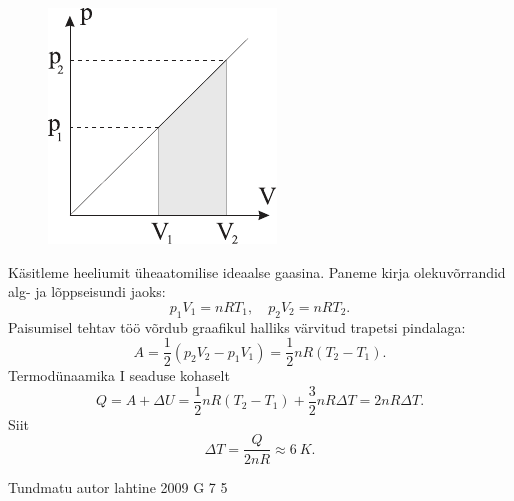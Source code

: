 \documentclass[11pt, twoside]{article}
\begin{document}
{{\ifSolution
\begin{figure}
	\begin{center}
		\vspace{-25pt}
		\includegraphics[width=0.95\linewidth]{2008-lahg-06-lah}
	\end{center}
\end{figure}
Käsitleme heeliumit üheaatomilise ideaalse gaasina. 
Paneme kirja olekuvõrrandid alg- ja lõppseisundi jaoks:
\[
p_1V_1 = nRT_1, \quad p_2V_2 = nRT_2.
\]
Paisumisel tehtav töö võrdub graafikul halliks värvitud
trapetsi pindalaga:
\[
A = \frac 12 (p_2V_2 - p_1V_1) = \frac 12 nR(T_2 - T_1).
\]
Termodünaamika I seaduse kohaselt 
\[
Q = A + \Delta U = \frac 12 nR(T_2 - T_1) + \frac 32 nR\Delta T = 2nR\Delta T.
\]
Siit
\[
\Delta T =\frac {Q}{2nR} \approx \SI{6}{K}.
\]
\fi
}

{Tundmatu autor} %
{lahtine} %
{2009} %
{G 7} %
{5} %
{

}}
\end{document}
